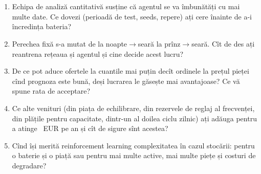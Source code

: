 \section{}
\begin{enumerate}
\item {}%
{Echipa de analiză cantitativă susține că agentul se va îmbunătăți cu mai multe date. Ce dovezi (perioadă de test, seeds, repere) ați cere înainte de a-i încredința bateria?}
\item {}%
{Perechea fixă s-a mutat de la noapte$\rightarrow$seară la prînz$\rightarrow$seară. Cît de des ați reantrena rețeaua și agentul și cine decide acest lucru?}
\item {}%
{De ce pot aduce ofertele la cuantile mai puțin decît ordinele la prețul pieței cînd prognoza este bună, deși lucrarea le găsește mai avantajoase? Ce vă spune rata de acceptare?}
\item {}%
{Ce alte venituri (din piața de echilibrare, din rezervele de reglaj al frecvenței, din plățile pentru capacitate, dintr-un al doilea ciclu zilnic) ați adăuga pentru a atinge \Nneed\ EUR pe an și cît de sigure sînt acestea?}
\item {}%
{Cînd își merită reinforcement learning complexitatea în cazul stocării: pentru o baterie și o piață sau pentru mai multe active, mai multe piețe și costuri de degradare?}
\end{enumerate}

